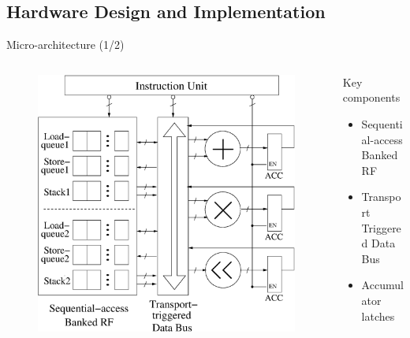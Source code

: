 \documentclass{beamer}
\begin{document}
\begin{CJK}{UTF8}{bkai}
    \subsection{Hardware Design and Implementation}
    \begin{frame}{Micro-architecture (1/2)}
        \begin{columns}
            \begin{column}{0.6\textwidth}
                \begin{figure}[!ht] 
                    \centering
                    \includegraphics[width=1.0\textwidth]{./figs/micro.eps}
                \end{figure}
            \end{column}
            \begin{column}{0.35\textwidth}
                \begin{block}{Key components}
                    \begin{itemize}
                        \item Sequential-access Banked RF
                        \item Transport Triggered Data Bus
                        \item Accumulator latches
                    \end{itemize}    
                \end{block}
            \end{column}
        \end{columns}
    \end{frame}


\end{CJK}
\end{document}
